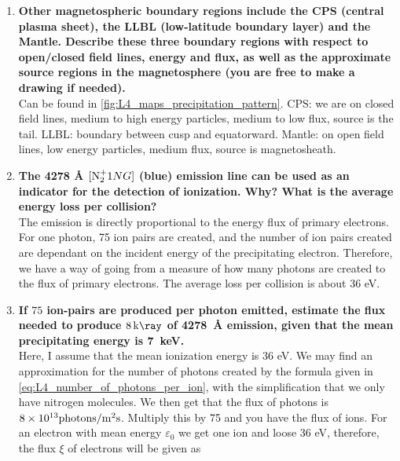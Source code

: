 \begin{enumerate}
\begin{enumerate}
        \item \textbf{Other magnetospheric boundary regions include the CPS (central plasma sheet), the LLBL (low-latitude boundary layer) and the Mantle. Describe these three boundary regions with respect to open/closed field lines, energy and flux, as well as the approximate source regions in the magnetosphere (you are free to make a drawing if needed).} \\ Can be found in \cref{fig:L4_maps_precipitation_pattern}. CPS\@: we are on closed field lines, medium to high energy particles, medium to low flux, source is the tail. LLBL\@: boundary between cusp and equatorward. Mantle: on open field lines, low energy particles, medium flux, source is magnetosheath.
        \item \textbf{The 4278 Å \([\tn{N}_2^+1NG]\) (blue) emission line can be used as an indicator for the detection of ionization. Why? What is the average energy loss per collision?}\\ The emission is directly proportional to the energy flux of primary electrons. For one photon, 75 ion pairs are created, and the number of ion pairs created are dependant on the incident energy of the precipitating electron. Therefore, we have a way of going from a measure of how many photons are created to the flux of primary electrons. The average loss per collision is about 36 eV.
        \item \textbf{If \(75\) ion-pairs are produced per photon emitted, estimate the flux needed to produce \(\SI{8}{\kilo\ray}\) of \SI{4278}{\angstrom} emission, given that the mean precipitating energy is \SI{7}{\kilo\electronvolt}.}\\ %
        Here, I assume that the mean ionization energy is 36 eV. We may find an approximation for the number of photons created by the formula given in \cref{eq:L4_number_of_photons_per_ion}, with the simplification that we only have nitrogen molecules. %
        We then get that the flux of photons is \(\num{8e13}\tn{photons}/\si{\metre^{2}\second}\). Multiply this by 75 and you have the flux of ions. For an electron with mean energy \(\varepsilon_0\) we get one ion and loose 36 eV, therefore, the flux \(\xi \) of electrons will be given as

\end{enumerate}
\end{enumerate}
